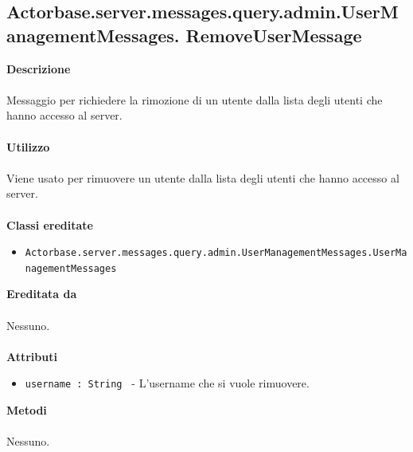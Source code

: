 \documentclass[a4paper]{article}
\begin{document}
	\subsection{Actorbase.server.messages.query.admin.UserManagementMessages.
	\newline RemoveUserMessage}
		\textbf{Descrizione}
			\\ \\
			Messaggio per richiedere la rimozione di un utente dalla lista degli utenti che hanno accesso al server.
			\\ \\
		\textbf{Utilizzo}
			\\ \\
			Viene usato per rimuovere un utente dalla lista degli utenti che hanno accesso al server.
			\\ \\
		\textbf{Classi ereditate}
			\begin{itemize}
				\item \texttt{Actorbase.server.messages.query.admin.UserManagementMessages.UserManagementMessages}
			\end{itemize}
		\textbf{Ereditata da}
			\\ \\
			Nessuno.
			\\ \\
		\textbf{Attributi}
			\begin{itemize}
				\item \texttt{username : String } - L'username che si vuole rimuovere.				
			\end{itemize}
		\textbf{Metodi}
			\\ \\
			Nessuno.	
			
\end{document}
